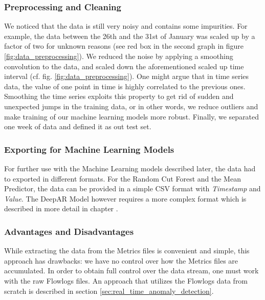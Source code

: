 \subsubsection{Preprocessing and Cleaning}
We noticed that the data is still very noisy and contains some impurities. For example, the data between the 26th and the 31st of January was scaled up by a factor of two for unknown reasons (see red box in the second graph in figure \ref{fig:data_preprocessing}).
We reduced the noise by applying a smoothing convolution to the data, and scaled down the aforementioned scaled up time interval (cf. fig. \ref{fig:data_preprocessing}).
One might argue that in time series data, the value of one point in time is highly correlated to the previous ones. Smoothing the time series exploits this property to get rid of sudden and unexpected jumps in the training data, or in other words, we reduce outliers and make training of our machine learning models more robust.
Finally, we separated one week of data and defined it as out test set.
\subsubsection{Exporting for Machine Learning Models}
For further use with the Machine Learning models described later, the data had to exported in different formats. For the Random Cut Forest and the Mean Predictor, the data can be provided in a simple CSV format with \textit{Timestamp} and \textit{Value}. The DeepAR Model however requires a more complex format which is described in more detail in chapter \pageref{ch:deepar}.

\subsubsection{Advantages and Disadvantages}
While extracting the data from the Metrics files is convenient and simple, this approach has drawbacks: we have no control over how the Metrics files are accumulated. In order to obtain full control over the data stream, one must work with the raw Flowlogs files. An approach that utilizes the Flowlogs data from scratch is described in section \ref{sec:real_time_anomaly_detection}.

